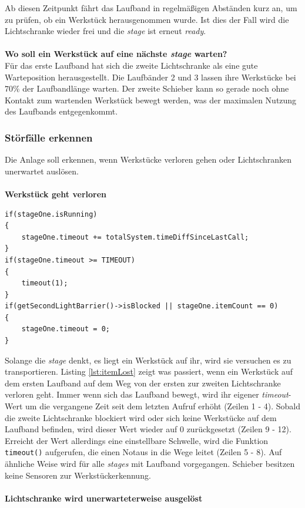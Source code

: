 \documentclass[fontsize=11pt,a4paper,final]{scrartcl}[2003/01/01]
\begin{document}
Ab diesen Zeitpunkt fährt das Laufband in regelmäßigen Abständen kurz an, um zu prüfen, ob ein Werkstück herausgenommen wurde. Ist dies der Fall wird die Lichtschranke wieder frei und die \textit{stage} ist erneut \textit{ready}. \\ \\
\textbf{Wo soll ein Werkstück auf eine nächste \textit{stage} warten?} \\
Für das erste Laufband hat sich die zweite Lichtschranke als eine gute Warteposition herausgestellt. Die Laufbänder 2 und 3 lassen ihre Werkstücke bei $70\%$ der Laufbandlänge warten. Der zweite Schieber kann so gerade noch ohne Kontakt zum wartenden Werkstück bewegt werden, was der maximalen Nutzung des Laufbands entgegenkommt.

\subsubsection{Störfälle erkennen}
Die Anlage soll erkennen, wenn Werkstücke verloren gehen oder Lichtschranken unerwartet auslösen. 
\\ \\
\textbf{Werkstück geht verloren}
\begin{lstlisting}[caption={Beispiel: Werkstück geht auf ersten Laufband verloren},label={lst:itemLost}]
if(stageOne.isRunning)
{
   	stageOne.timeout += totalSystem.timeDiffSinceLastCall;
}
if(stageOne.timeout >= TIMEOUT)
{
   	timeout(1);
}
if(getSecondLightBarrier()->isBlocked || stageOne.itemCount == 0)
{
   	stageOne.timeout = 0;
}
\end{lstlisting}
Solange die \textit{stage} denkt, es liegt ein Werkstück auf ihr, wird sie versuchen es zu transportieren. Listing \ref{lst:itemLost} zeigt was passiert, wenn ein Werkstück auf dem ersten Laufband auf dem Weg von der ersten zur zweiten Lichtschranke verloren geht. Immer wenn sich das Laufband bewegt, wird ihr eigener \textit{timeout}-Wert um die vergangene Zeit seit dem letzten Aufruf erhöht (Zeilen 1 - 4). Sobald die zweite Lichtschranke blockiert wird oder sich keine Werkstücke auf dem Laufband befinden, wird dieser Wert wieder auf $0$ zurückgesetzt (Zeilen 9 - 12). Erreicht der Wert allerdings eine einstellbare Schwelle, wird die Funktion \lstinline|timeout()| aufgerufen, die einen Notaus in die Wege leitet (Zeilen 5 - 8). Auf ähnliche Weise wird für alle \textit{stages} mit Laufband vorgegangen. Schieber besitzen keine Sensoren zur Werkstückerkennung.\\ \\
\textbf{Lichtschranke wird unerwarteterweise ausgelöst}
\end{document}
